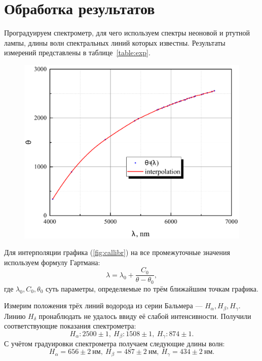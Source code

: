 \documentclass[a4paper,12pt]{article} %
\begin{document}
	\section{Обработка результатов}
		Проградуируем спектрометр, для чего используем спектры неоновой и ртутной лампы, длины волн спектральных линий которых известны. Результаты измерений представлены в таблице~\ref{table:exp}.
		\begin{figure}[h!]
			\begin{floatrow}
				{\includegraphics[scale=0.5]{graph.pdf}}
			\end{floatrow}
		\end{figure}
	
		Для интерполяции графика (\ref{fig:callibr}) на все промежуточные значения используем формулу Гартмана:
		\begin{equation*}
			\lambda=\lambda_0+\dfrac{C_0}{\theta-\theta_0},
		\end{equation*}
		где $\lambda_0, C_0,\theta_0$ суть параметры, определяемые по трём ближайшим точкам графика.
		
		Измерим положения трёх линий водорода из серии Бальмера --- $H_{\alpha}, H_{\beta}, H_{\gamma}$. Линию $H_{\delta}$ пронаблюдать не удалось ввиду её слабой интенсивности.	Получили соответствующие показания спектрометра:
		\begin{equation*}
			H_{\alpha}: 2500\pm 1, \  H_{\beta} : 1508 \pm 1, \ H_{\gamma} : 874 \pm 1.
		\end{equation*}
		С учётом градуировки спектрометра получаем следующие длины волн: 
		\begin{equation*}
			H_{\alpha} = 656 \pm 2 \ \text{нм}, \ H_{\beta} = 487 \pm 2 \ \text{нм}, \ H_{\gamma} = 434 \pm 2\  \text{нм}.
		\end{equation*}
		
\end{document}
